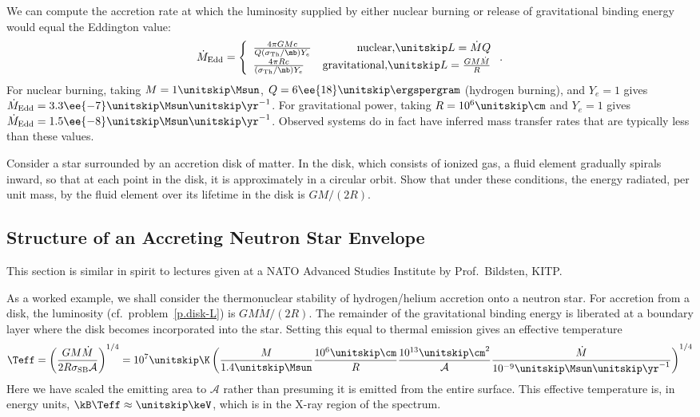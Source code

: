 We can compute the accretion rate at which the luminosity supplied by either nuclear burning or release of gravitational binding energy would equal the Eddington value:
\[
\dot{M}_{\mathrm{Edd}} = \left\{\begin{array}{lr}
	\frac{4\pi GM c}{Q(\sigma_{\mathrm{Th}}/\mb)Y_{e}}  & \textrm{nuclear,}\nsp L = \dot{M}Q \\
	\frac{4\pi R c}{(\sigma_{\mathrm{Th}}/\mb)Y_{e}} & \textrm{gravitational,}\nsp L= \frac{GM\dot{M}}{R}
\end{array}\right. .
\]
For nuclear burning, taking $M = 1\nsp\Msun$, $Q = 6\ee{18}\nsp\ergspergram$ (hydrogen burning), and $Y_{e} = 1$ gives $\dot{M}_{\mathrm{Edd}} = 3.3\ee{-7}\nsp\Msun\usp\yr^{-1}$.  For gravitational power, taking $R = 10^{6}\nsp\cm$ and $Y_{e} = 1$ gives $\dot{M}_{\mathrm{Edd}} = 1.5\ee{-8}\nsp\Msun\usp\yr^{-1}$.  Observed systems do in fact have inferred mass transfer rates that are typically less than these values.

\begin{exercisebox}\label{p.disk-L} Consider a star surrounded by an accretion disk of matter.  In the disk, which consists of ionized gas, a fluid element gradually spirals inward, so that at each point in the disk, it is approximately in a circular orbit.  Show that under these conditions, the energy radiated, per unit mass, by the fluid element over its lifetime in the disk is $GM/(2R)$.
\end{exercisebox}

\subsection[Accreting Neutron Star Envelopes]{Structure of an Accreting Neutron Star Envelope}

This section is similar in spirit to lectures\cite{bildsten:thermonuclear}  given at a NATO Advanced Studies Institute by Prof.~Bildsten, KITP.

As a worked example, we shall consider the thermonuclear stability of hydrogen/helium accretion onto a neutron star.  For accretion from a disk, the luminosity (cf.\ problem~\ref{p.disk-L}) is $GM\dot{M}/(2R)$.  The remainder of the gravitational binding energy is liberated at a boundary layer where the disk becomes incorporated into the star.  Setting this equal to thermal emission gives an effective temperature
\[
	\Teff = \left(\frac{GM\dot{M}}{2R\ssb\mathcal{A}}\right)^{1/4} = 10^{7}\nsp\K \left(\frac{M}{1.4\nsp\Msun}\frac{10^{6}\nsp\cm}{R}\frac{10^{13}\nsp\cm^{2}}{\mathcal{A}}\frac{\dot{M}}{10^{-9}\nsp\Msun\usp\yr^{-1}}\right)^{1/4}
\]
Here we have scaled the emitting area to $\mathcal{A}$ rather than presuming it is emitted from the entire surface. This effective temperature is, in energy units, $\kB \Teff\approx \nsp\keV$, which is in the X-ray region of the spectrum.  

